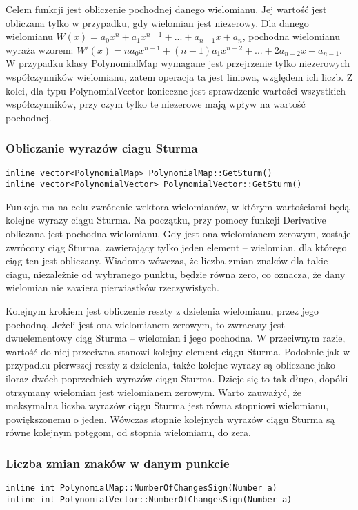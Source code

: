 Celem funkcji jest obliczenie pochodnej danego wielomianu. Jej wartość jest obliczana tylko w przypadku, gdy wielomian jest niezerowy. Dla danego wielomianu $W(x) = a_0x^n + a_1x^{n-1} + ... + a_{n-1}x + a_n$, pochodna wielomianu wyraża wzorem: $W'(x) = na_0x^{n-1} + (n-1)a_1x^{n-2} + ... + 2a_{n-2}x + a_{n-1}$. W przypadku klasy PolynomialMap wymagane jest przejrzenie tylko niezerowych współczynników wielomianu, zatem operacja ta jest liniowa, względem ich liczb. Z kolei, dla typu PolynomialVector konieczne jest sprawdzenie wartości wszystkich współczynników, przy czym tylko te niezerowe mają wpływ na wartość pochodnej.

\subsubsection{Obliczanie wyrazów ciagu Sturma}
\begin{lstlisting}
inline vector<PolynomialMap> PolynomialMap::GetSturm()
inline vector<PolynomialVector> PolynomialVector::GetSturm()
\end{lstlisting}

Funkcja ma na celu zwrócenie wektora wielomianów, w którym wartościami będą kolejne wyrazy ciągu Sturma. Na początku, przy pomocy funkcji Derivative obliczana jest pochodna wielomianu. Gdy jest ona wielomianem zerowym, zostaje zwrócony ciąg Sturma, zawierający tylko jeden element – wielomian, dla którego ciąg ten jest obliczany. Wiadomo wówczas, że liczba zmian znaków dla takie ciagu, niezależnie od wybranego punktu, będzie równa zero, co oznacza, że dany wielomian nie zawiera pierwiastków rzeczywistych.

Kolejnym krokiem jest obliczenie reszty z dzielenia wielomianu, przez jego pochodną. Jeżeli jest ona wielomianem zerowym, to zwracany jest dwuelementowy ciąg Sturma – wielomian i jego pochodna. W przeciwnym razie, wartość do niej przeciwna stanowi kolejny element ciągu Sturma. Podobnie jak w przypadku pierwszej reszty z dzielenia, także kolejne wyrazy są obliczane jako iloraz dwóch poprzednich wyrazów ciągu Sturma. Dzieje się to tak długo, dopóki otrzymany wielomian jest wielomianem zerowym. Warto zauważyć, że maksymalna liczba wyrazów ciągu Sturma jest równa stopniowi wielomianu, powiększonemu o jeden. Wówczas stopnie kolejnych wyrazów ciągu Sturma są równe kolejnym potęgom, od stopnia wielomianu, do zera.

\subsubsection{Liczba zmian znaków w danym punkcie}
\begin{lstlisting}
inline int PolynomialMap::NumberOfChangesSign(Number a)
inline int PolynomialVector::NumberOfChangesSign(Number a)
\end{lstlisting}

